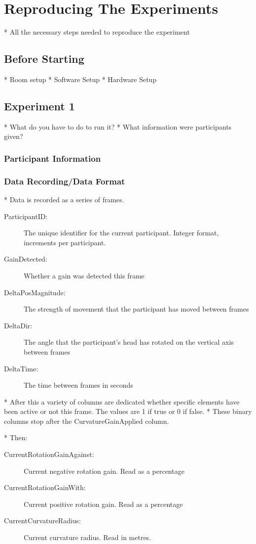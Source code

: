 \chapter{Reproducing The Experiments} \label{app:reproduction}
* All the necessary steps needed to reproduce the experiment

\section{Before Starting}
* Room setup
* Software Setup
* Hardware Setup

\section{Experiment 1}
* What do you have to do to run it?
* What information were participants given?

\subsection{Participant Information}\label{sec:ex1information}

\subsection{Data Recording/Data Format}
* Data is recorded as a series of frames.

\begin{description}
   \item[ParticipantID: ] The unique identifier for the current participant. Integer format, increments per participant. 
   \item[GainDetected: ] Whether a gain was detected this frame
   \item[DeltaPosMagnitude: ] The strength of movement that the participant has moved between frames
   \item[DeltaDir: ] The angle that the participant's head has rotated on the vertical axis between frames
   \item[DeltaTime: ] The time between frames in seconds
\end{description}
* After this a variety of columns are dedicated whether specific elements have been active or not this frame. The values are 1 if true or 0 if false.
* These binary columns stop after the CurvatureGainApplied column. 

* Then:
\begin{description}
   \item[CurrentRotationGainAgainst: ] Current negative rotation gain. Read as a percentage
   \item[CurrentRotationGainWith: ] Current positive rotation gain. Read as a percentage
   \item[CurrentCurvatureRadius: ] Current curvature radius. Read in metres. 
\end{description}

